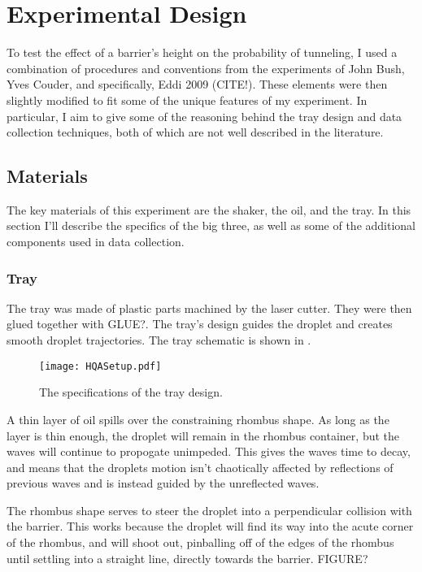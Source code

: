 \chapter{Experimental Design}

To test the effect of a barrier's height on the probability of tunneling, I used a combination of procedures and conventions from the experiments of John Bush, Yves Couder, and specifically, Eddi 2009 (CITE!). These elements were then slightly modified to fit some of the unique features of my experiment. In particular, I aim to give some of the reasoning behind the tray design and data collection techniques, both of which are not well described in the literature.

\section{Materials}
The key materials of this experiment are the shaker, the oil, and the tray. In this section I'll describe the specifics of the big three, as well as some of the additional components used in data collection. 

\subsection{Tray}
The tray was made of plastic parts machined by the laser cutter. They were then glued together with GLUE?. The tray's design guides the droplet and creates smooth droplet trajectories. The tray schematic is shown in . 

\begin{figure}[h]
	\centering
	\texttt{[image: HQASetup.pdf]}
	\caption{The specifications of the tray design. }
	\label{tray}
\end{figure}

A thin layer of oil spills over the constraining rhombus shape. As long as the layer is thin enough, the droplet will remain in the rhombus container, but the waves will continue to propogate unimpeded. This gives the waves time to decay, and means that the droplets motion isn't chaotically affected by reflections of previous waves and is instead guided by the unreflected waves. 

The rhombus shape serves to steer the droplet into a perpendicular collision with the barrier. This works because the droplet will find its way into the acute corner of the rhombus, and will shoot out, pinballing off of the edges of the rhombus until settling into a straight line, directly towards the barrier.  FIGURE?

